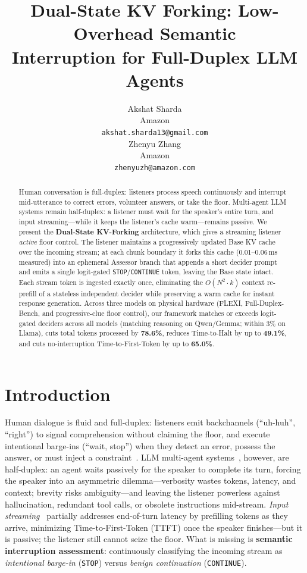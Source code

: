 \documentclass{article}
\title{Dual-State KV Forking: Low-Overhead Semantic \\ Interruption for Full-Duplex LLM Agents}
\author{%
  Akshat Sharda \\
  Amazon \\
  \texttt{akshat.sharda13@gmail.com} \\
  \And
  Zhenyu Zhang \\
  Amazon \\
  \texttt{zhenyuzh@amazon.com} \\
}
\begin{document}
\maketitle

\begin{abstract}
Human conversation is full-duplex: listeners process speech continuously and interrupt mid-utterance to correct errors, volunteer answers, or take the floor. Multi-agent LLM systems remain half-duplex: a listener must wait for the speaker's entire turn, and input streaming---while it keeps the listener's cache warm---remains passive. We present the \textbf{Dual-State KV-Forking} architecture, which gives a streaming listener \emph{active} floor control. The listener maintains a progressively updated Base KV cache over the incoming stream; at each chunk boundary it forks this cache (0.01--0.06\,ms measured) into an ephemeral Assessor branch that appends a short decider prompt and emits a single logit-gated \texttt{STOP}/\texttt{CONTINUE} token, leaving the Base state intact. Each stream token is ingested exactly once, eliminating the $O(N^2 \cdot k)$ context re-prefill of a stateless independent decider while preserving a warm cache for instant response generation. Across three models on physical hardware (FLEXI, Full-Duplex-Bench, and progressive-clue floor control), our framework matches or exceeds logit-gated deciders across all models (matching reasoning on Qwen/Gemma; within 3\% on Llama), cuts total tokens processed by \textbf{78.6\%}, reduces Time-to-Halt by up to \textbf{49.1\%}, and cuts no-interruption Time-to-First-Token by up to \textbf{65.0\%}.
\end{abstract}

\section{Introduction}
\label{sec:intro}

Human dialogue is fluid and full-duplex: listeners emit backchannels (``uh-huh'', ``right'') to signal comprehension without claiming the floor, and execute intentional barge-ins (``wait, stop'') when they detect an error, possess the answer, or must inject a constraint~\citep{sacks1974turntaking, yngve1970, skantze2021review}. LLM multi-agent systems~\citep{wu2023autogen, li2023camel}, however, are half-duplex: an agent waits passively for the speaker to complete its turn, forcing the speaker into an asymmetric dilemma---verbosity wastes tokens, latency, and context; brevity risks ambiguity---and leaving the listener powerless against hallucination, redundant tool calls, or obsolete instructions mid-stream. \emph{Input streaming}~\citep{xiao2023streamingllm, agrawal2023sarathi} partially addresses end-of-turn latency by prefilling tokens as they arrive, minimizing Time-to-First-Token (TTFT) once the speaker finishes---but it is passive; the listener still cannot seize the floor. What is missing is \textbf{semantic interruption assessment}: continuously classifying the incoming stream as \emph{intentional barge-in} (\texttt{STOP}) versus \emph{benign continuation} (\texttt{CONTINUE}).
\end{document}
